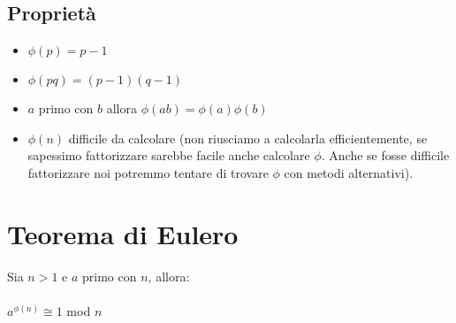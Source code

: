 \subsection{Proprietà}
\begin{itemize}
	\item $\phi(p) = p - 1$ 
	\item $\phi(pq) = (p - 1) (q - 1)$
	\item $a$ primo con $b$ allora $\phi(ab) = \phi(a) \phi(b)$
	\item $\phi(n)$ difficile da calcolare (non riusciamo a calcolarla efficientemente, se sapessimo fattorizzare sarebbe facile anche calcolare $\phi$. Anche se fosse difficile fattorizzare noi potremmo tentare di trovare $\phi$ con metodi alternativi).
\end{itemize}

\section{Teorema di Eulero}

Sia $n > 1$ e $a$ primo con $n$, allora:\\\\
$a^{\phi(n)} \cong 1$ mod $n$ 